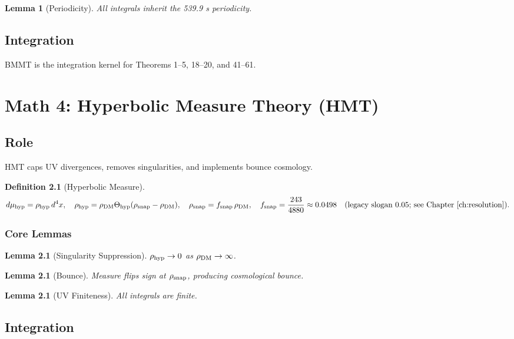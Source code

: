 \documentclass[11pt,a4paper]{book}
\newtheorem{lemma}[theorem]{Lemma}
\newtheorem{definition}[theorem]{Definition}
\theoremstyle{remark}
\theoremstyle{definition}
\begin{document}
\begin{lemma}[Periodicity]
All integrals inherit the 539.9 s periodicity.
\end{lemma}

\section{Integration}

BMMT is the integration kernel for Theorems 1–5, 18–20, and 41–61.

\chapter{Math 4: Hyperbolic Measure Theory (HMT)}

\section{Role}

HMT caps UV divergences, removes singularities, and implements bounce cosmology.

\begin{definition}[Hyperbolic Measure]
\[ d\mu_{\rm hyp} = \rho_{\rm hyp} \, d^4x, \quad \rho_{\rm hyp} = \rho_{\rm DM} \Theta_{\rm hyp}(\rho_{\rm snap} - \rho_{\rm DM}), \quad
\rho_{\rm snap} = f_{\rm snap}\,\rho_{\rm DM},\quad
f_{\rm snap} = \frac{243}{4880}\approx 0.0498
\quad\text{(legacy slogan \(0.05\); see Chapter~\ref{ch:resolution})}. \]
\end{definition}

\subsection{Core Lemmas}

\begin{lemma}[Singularity Suppression]
\(\rho_{\rm hyp}\to0\) as \(\rho_{\rm DM}\to\infty\).
\end{lemma}

\begin{lemma}[Bounce]
Measure flips sign at \(\rho_{\rm snap}\), producing cosmological bounce.
\end{lemma}

\begin{lemma}[UV Finiteness]
All integrals are finite.
\end{lemma}

\section{Integration}
\end{document}
